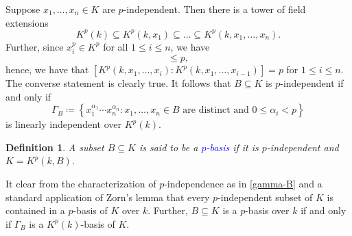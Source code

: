 \documentclass[10pt]{article}
\theoremstyle{thmstyle}
\theoremstyle{defstyle}
\newtheorem{definition}[theorem]{Definition}
\newcommand{\define}[1]{\textcolor{blue}{\textit{#1}}}
\renewcommand{\le}{\leqslant}
\begin{document}
Suppose $x_1,\dots,x_n\in K$ are $p$-independent. Then there is a tower of field extensions
\begin{equation*}
    K^p(k)\subseteq K^p(k, x_1)\subseteq\dots\subseteq K^p(k, x_1,\dots,x_n).
\end{equation*}
Further, since $x_i^p\in K^p$ for all $1\le i\le n$, we have 
\begin{equation*}
    [K^p(k, x_1,\dots,x_i) : K^p(k, x_1,\dots,x_{i - 1})]\le p,
\end{equation*}
hence, we have that $[K^p(k, x_1,\dots,x_i) : K^p(k, x_1,\dots,x_{i - 1})] = p$ for $1\le i\le n$. The converse statement is clearly true. It follows that $B\subseteq K$ is $p$-independent if and only if 
\begin{equation*}
    \Gamma_B \coloneq\left\{x_1^{\alpha_1}\cdots x_n^{\alpha_n}\colon x_1,\dots,x_n\in B\text{ are distinct and }0\le \alpha_i < p\right\}\label{gamma-B}
\end{equation*}
is linearly independent over $K^p(k)$.

\begin{definition}
    A subset $B\subseteq K$ is said to be a \define{$p$-basis} if it is $p$-independent and  $K = K^p(k, B)$.
\end{definition}

It clear from the characterization of $p$-independence as in \eqref{gamma-B} and a standard application of Zorn's lemma that every $p$-independent subset of $K$ is contained in a $p$-basis of $K$ over $k$. Further, $B\subseteq K$ is a $p$-basis over $k$ if and only if $\Gamma_B$ is a $K^p(k)$-basis of $K$.
\end{document}
